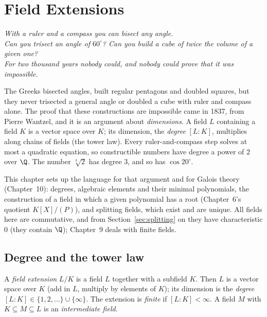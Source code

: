 \chapter{Field Extensions}

\begin{center}\itshape
With a ruler and a compass you can bisect any angle.\\
Can you trisect an angle of $60^\circ$? Can you build a cube of twice the volume of a given one?\\
For two thousand years nobody could, and nobody could prove that it was impossible.
\end{center}

The Greeks bisected angles, built regular pentagons and doubled squares, but they never trisected a general angle or doubled a cube with ruler and compass alone. The proof that these constructions are impossible came in 1837, from Pierre Wantzel, and it is an argument about \emph{dimensions}. A field $L$ containing a field $K$ is a vector space over $K$; its dimension, the \emph{degree} $[L:K]$, multiplies along chains of fields (the tower law). Every ruler-and-compass step solves at most a quadratic equation, so constructible numbers have degree a power of $2$ over $\Q$. The number $\sqrt[3]2$ has degree $3$, and so has $\cos20^\circ$.

This chapter sets up the language for that argument and for Galois theory (Chapter~10): degrees, algebraic elements and their minimal polynomials, the construction of a field in which a given polynomial has a root (Chapter~6's quotient $K[X]/(P)$), and splitting fields, which exist and are unique. All fields here are commutative, and from Section~\ref{sec:splitting} on they have characteristic $0$ (they contain $\Q$); Chapter~9 deals with finite fields.

\section{Degree and the tower law}

\begin{definition}
A \emph{field extension} $L/K$ is a field $L$ together with a subfield $K$. Then $L$ is a vector space over $K$ (add in $L$, multiply by elements of $K$); its dimension is the \emph{degree} $[L:K]\in\{1,2,\dots\}\cup\{\infty\}$. The extension is \emph{finite} if $[L:K]<\infty$. A field $M$ with $K\subseteq M\subseteq L$ is an \emph{intermediate field}.
\end{definition}

